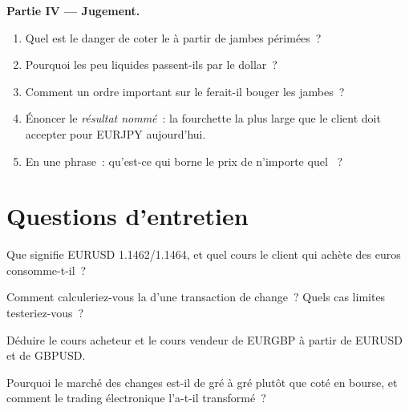 \begin{problem}
\medskip\noindent\textbf{Partie IV --- Jugement.}
\begin{enumerate}[resume]
\item Quel est le danger de coter le  à partir de jambes périmées~?
\item Pourquoi les  peu liquides passent-ils par le dollar~?
\item Comment un ordre important sur le  ferait-il bouger les jambes~?
\item Énoncer le \emph{résultat nommé}~: la fourchette la plus large que le client doit accepter
pour EURJPY aujourd'hui.
\item En une phrase~: qu'est-ce qui borne le prix de n'importe quel ~?
\end{enumerate}
\end{problem}

\section{Questions d'entretien}

\begin{interviewq}\label{iq:m2:the-fx-market:1}
Que signifie EURUSD 1.1462/1.1464, et quel cours le client qui achète des euros
consomme-t-il~?
\end{interviewq}

\begin{interviewq}\label{iq:m2:the-fx-market:2}
Comment calculeriez-vous la  d'une transaction de change~? Quels cas limites testeriez-vous~?
\end{interviewq}

\begin{interviewq}\label{iq:m2:the-fx-market:3}
Déduire le cours acheteur et le cours vendeur de EURGBP à partir de EURUSD et de GBPUSD.
\end{interviewq}

\begin{interviewq}\label{iq:m2:the-fx-market:4}
Pourquoi le marché des changes est-il de gré à gré plutôt que coté en bourse, et comment le
trading électronique l'a-t-il transformé~?
\end{interviewq}

